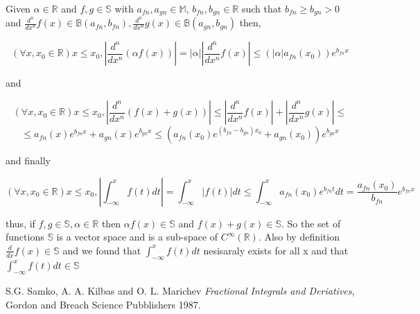 \documentclass[%
 preprint,
 amsmath, amssymb, aps, pra, 10pt
]{revtex4-2}
\begin{document}
Given $\alpha \in \mathbb{R}$ and $f, g \in \mathbb{S}$ with $a_{fn}, a_{gn} \in \mathbb{M}$, $ b_{fn}, b_{gn} \in \mathbb{R}$ such that $b_{fn} \geq b_{gn} > 0$ and $\frac{d^n}{dx^n} f(x) \in \mathbb{B}(a_{fn}, b_{fn}), \frac{d^n}{dx^n} g(x) \in \mathbb{B}(a_{gn}, b_{gn})$ then,

\[(\forall x, x_0 \in \mathbb{R}) x \leq x_0, \left|\frac{d^n}{dx^n} (\alpha f(x))\right| = |\alpha| \left|\frac{d^n}{dx^n}f(x)\right| \leq (|\alpha| a_{fn}(x_0))e^{b_{fn}x}\]

and

\[(\forall x, x_0 \in \mathbb{R}) x \leq x_0, \left|\frac{d^n}{dx^n}(f(x) + g(x))\right| \leq \left|\frac{d^n}{dx^n} f(x)\right| + \left|\frac{d^n}{dx^n} g(x)\right| \leq \]
\[\leq a_{fn}(x)e^{b_{fn}x} + a_{gn}(x)e^{b_{gn}x} \leq \left(a_{fn}(x_0)e^{(b_{fn} - b_{gn})x_0} + a_{gn}(x_0)\right)e^{b_{gn}x}\]

and finally

\[(\forall x, x_0 \in \mathbb{R}) x \leq x_0, \left|\int_{-\infty}^x f(t)dt\right| = \int_{-\infty}^x \left|f(t)\right| dt \leq \int_{-\infty}^x a_{fn}(x_0)e^{b_{fn}t}dt = \frac{a_{fn}(x_0)}{b_{fn}}e^{b_{fn}x}\]

thus, if $f, g \in \mathbb{S}, \alpha \in \mathbb{R}$ then $\alpha f(x) \in \mathbb{S}$ and $f(x) + g(x) \in \mathbb{S}$. So the set of functions $\mathbb{S}$ is a vector space and is a sub-space of $C^\infty(\mathbb{R})$. Also by definition $\frac{d}{dx}f(x) \in \mathbb{S}$ and we found that $\int_{-\infty}^x f(t)dt$ nesisaraly exists for all x and that $\int_{-\infty}^x f(t)dt \in \mathbb{S}$



\begin{thebibliography}{1}

  S.G. Samko, A. A. Kilbas and O. L. Marichev
  \textit{Fractional Integrals and Deriatives},
  Gordon and Breach Science Pubblishers
  1987.

\end{thebibliography}
\end{document}
